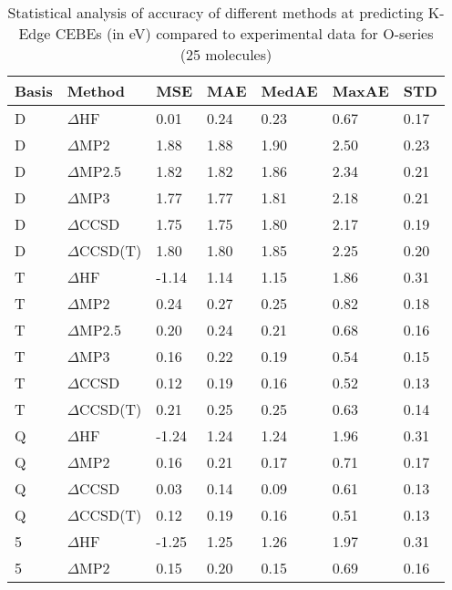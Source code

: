 \begin{table}
  \caption{Statistical analysis of accuracy of different methods at predicting K-Edge CEBEs (in eV) compared to experimental data for O-series (25 molecules)}
  \label{tbl:summary-o}
  \begin{tabular}{l l l l l l l }
    \toprule
    \textbf{Basis} & \textbf{Method} & \textbf{MSE} & \textbf{MAE} & \textbf{MedAE} & \textbf{MaxAE} & \textbf{STD} \\ 
    \midrule
    D & $\Delta$HF & 0.01 & 0.24 & 0.23 & 0.67 & 0.17 \\ 
    D & $\Delta$MP2 & 1.88 & 1.88 & 1.90 & 2.50 & 0.23 \\ 
    D & $\Delta$MP2.5 & 1.82 & 1.82 & 1.86 & 2.34 & 0.21 \\ 
    D & $\Delta$MP3 & 1.77 & 1.77 & 1.81 & 2.18 & 0.21 \\ 
    D & $\Delta$CCSD & 1.75 & 1.75 & 1.80 & 2.17 & 0.19 \\ 
    D & $\Delta$CCSD(T) & 1.80 & 1.80 & 1.85 & 2.25 & 0.20 \\ 
    T & $\Delta$HF & -1.14 & 1.14 & 1.15 & 1.86 & 0.31 \\ 
    T & $\Delta$MP2 & 0.24 & 0.27 & 0.25 & 0.82 & 0.18 \\ 
    T & $\Delta$MP2.5 & 0.20 & 0.24 & 0.21 & 0.68 & 0.16 \\ 
    T & $\Delta$MP3 & 0.16 & 0.22 & 0.19 & 0.54 & 0.15 \\ 
    T & $\Delta$CCSD & 0.12 & 0.19 & 0.16 & 0.52 & 0.13 \\ 
    T & $\Delta$CCSD(T) & 0.21 & 0.25 & 0.25 & 0.63 & 0.14 \\ 
    Q & $\Delta$HF & -1.24 & 1.24 & 1.24 & 1.96 & 0.31 \\ 
    Q & $\Delta$MP2 & 0.16 & 0.21 & 0.17 & 0.71 & 0.17 \\ 
    Q & $\Delta$CCSD & 0.03 & 0.14 & 0.09 & 0.61 & 0.13 \\ 
    Q & $\Delta$CCSD(T) & 0.12 & 0.19 & 0.16 & 0.51 & 0.13 \\ 
    5 & $\Delta$HF & -1.25 & 1.25 & 1.26 & 1.97 & 0.31 \\ 
    5 & $\Delta$MP2 & 0.15 & 0.20 & 0.15 & 0.69 & 0.16 \\ 
    \bottomrule
  \end{tabular}
\end{table}
